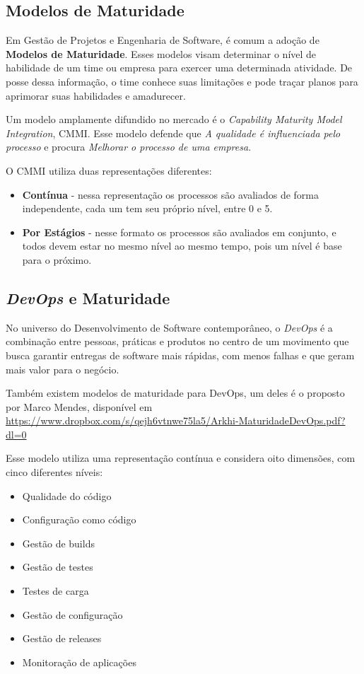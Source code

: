 \documentclass[10pt,a4paper]{article}
\begin{document}
	\subsection{Modelos de Maturidade}
	
	Em Gestão de Projetos e Engenharia de Software, é comum a adoção de \textbf{Modelos de Maturidade}. Esses modelos visam determinar o nível de habilidade de um time ou empresa para exercer uma determinada atividade. De posse dessa informação, o time conhece suas limitações e pode traçar planos para aprimorar suas habilidades e amadurecer.
	
	Um modelo amplamente difundido no mercado é o \textit{Capability Maturity Model Integration}, CMMI. Esse modelo defende que \emph{A qualidade é influenciada pelo processo} e procura \emph{Melhorar o processo de uma empresa}.
	
	O CMMI utiliza duas representações diferentes:
	
	\begin{itemize}
	    \item \textbf{Contínua} - nessa representação os processos são avaliados de forma independente, cada um tem seu próprio nível, entre 0 e 5.
	    \item \textbf{Por Estágios} - nesse formato os processos são avaliados em conjunto, e todos devem estar no mesmo nível ao mesmo tempo, pois um nível é base para o próximo.
	\end{itemize}
	
	\subsection{\emph{DevOps} e Maturidade}
	\label{introducao_devops_maturidade}
	
	No universo do Desenvolvimento de Software contemporâneo, o \emph{DevOps} é a combinação entre pessoas, práticas e produtos no centro de um movimento que busca garantir entregas de software mais rápidas, com menos falhas e que geram mais valor para o negócio.
	
	Também existem modelos de maturidade para DevOps, um deles é o proposto por Marco Mendes, disponível em \url{https://www.dropbox.com/s/qejh6vtnwe75la5/Arkhi-MaturidadeDevOps.pdf?dl=0}
	
	Esse modelo utiliza uma representação contínua e considera oito dimensões, com cinco diferentes níveis:
	
	\begin{itemize}
	    \item Qualidade do código
	    \item Configuração como código
	    \item Gestão de builds
	    \item Gestão de testes
	    \item Testes de carga
	    \item Gestão de configuração
	    \item Gestão de releases
	    \item Monitoração de aplicações
	\end{itemize}
	
\end{document}
